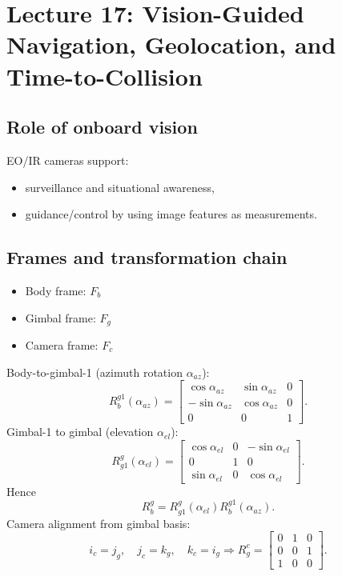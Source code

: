 \documentclass[11pt,a4paper]{article}
\begin{document}
\newpage
\section{Lecture 17: Vision-Guided Navigation, Geolocation, and Time-to-Collision}

\subsection{Role of onboard vision}
EO/IR cameras support:
\begin{itemize}
  \item surveillance and situational awareness,
  \item guidance/control by using image features as measurements.
\end{itemize}

\subsection{Frames and transformation chain}
\begin{itemize}
  \item Body frame: $F_b$
  \item Gimbal frame: $F_g$
  \item Camera frame: $F_c$
\end{itemize}
Body-to-gimbal-1 (azimuth rotation $\alpha_{az}$):
\[
R_b^{g1}(\alpha_{az})=
\begin{bmatrix}
\cos\alpha_{az} & \sin\alpha_{az} & 0\\
-\sin\alpha_{az} & \cos\alpha_{az} & 0\\
0 & 0 & 1
\end{bmatrix}.
\]
Gimbal-1 to gimbal (elevation $\alpha_{el}$):
\[
R_{g1}^{g}(\alpha_{el})=
\begin{bmatrix}
\cos\alpha_{el} & 0 & -\sin\alpha_{el}\\
0 & 1 & 0\\
\sin\alpha_{el} & 0 & \cos\alpha_{el}
\end{bmatrix}.
\]
Hence
\[
R_b^g=R_{g1}^g(\alpha_{el})R_b^{g1}(\alpha_{az}).
\]
Camera alignment from gimbal basis:
\[
i_c=j_g,\quad j_c=k_g,\quad k_c=i_g
\Rightarrow
R_g^c=
\begin{bmatrix}
0&1&0\\
0&0&1\\
1&0&0
\end{bmatrix}.
\]
\end{document}
